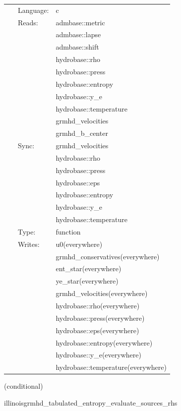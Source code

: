 \hspace{5mm}

 \begin{tabular*}{160mm}{cll} 
~ & Language:  & c \\ 
~ & Reads:  & admbase::metric \\ 
~& ~ &admbase::lapse\\ 
~& ~ &admbase::shift\\ 
~& ~ &hydrobase::rho\\ 
~& ~ &hydrobase::press\\ 
~& ~ &hydrobase::entropy\\ 
~& ~ &hydrobase::y\_e\\ 
~& ~ &hydrobase::temperature\\ 
~& ~ &grmhd\_velocities\\ 
~& ~ &grmhd\_b\_center\\ 
~ & Sync:  & grmhd\_velocities \\ 
~& ~ &hydrobase::rho\\ 
~& ~ &hydrobase::press\\ 
~& ~ &hydrobase::eps\\ 
~& ~ &hydrobase::entropy\\ 
~& ~ &hydrobase::y\_e\\ 
~& ~ &hydrobase::temperature\\ 
~ & Type:  & function \\ 
~ & Writes:  & u0(everywhere) \\ 
~& ~ &grmhd\_conservatives(everywhere)\\ 
~& ~ &ent\_star(everywhere)\\ 
~& ~ &ye\_star(everywhere)\\ 
~& ~ &grmhd\_velocities(everywhere)\\ 
~& ~ &hydrobase::rho(everywhere)\\ 
~& ~ &hydrobase::press(everywhere)\\ 
~& ~ &hydrobase::eps(everywhere)\\ 
~& ~ &hydrobase::entropy(everywhere)\\ 
~& ~ &hydrobase::y\_e(everywhere)\\ 
~& ~ &hydrobase::temperature(everywhere)\\ 
\end{tabular*} 


\vspace{5mm}

   (conditional) 

\hspace{5mm} illinoisgrmhd\_tabulated\_entropy\_evaluate\_sources\_rhs 

